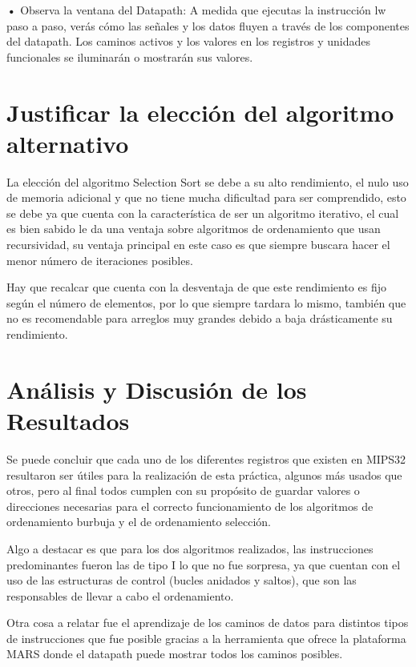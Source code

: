 \documentclass{article}
\begin{document}
\quad

\textbf{• } { Observa la ventana del Datapath: A medida que ejecutas la instrucción lw paso a paso, verás cómo las señales y los datos fluyen a través de los componentes del datapath. Los caminos activos y los valores en los registros y unidades funcionales se iluminarán o mostrarán sus valores.}


\quad
\newpage








\section{Justificar la elección del algoritmo alternativo}

\quad

{ La elección del algoritmo Selection Sort se debe a su alto rendimiento, el nulo uso de memoria adicional y que no tiene mucha dificultad para ser comprendido, esto se debe ya que cuenta con la característica de ser un algoritmo iterativo, el cual es bien sabido le da una ventaja sobre algoritmos de ordenamiento que usan recursividad, su ventaja principal en este caso es que siempre buscara hacer el menor número de iteraciones posibles.}

\quad

{ Hay que recalcar que cuenta con la desventaja de que este rendimiento es fijo según el número de elementos, por lo que siempre tardara lo mismo, también que no es recomendable para arreglos muy grandes debido a baja drásticamente su rendimiento.}

\quad
\newpage









\section{Análisis y Discusión de los Resultados}

\quad

{ Se puede concluir que cada uno de los diferentes registros que existen en MIPS32 resultaron ser útiles para la realización de esta práctica, algunos más usados que otros, pero al final todos cumplen con su propósito de guardar valores o direcciones necesarias para el correcto funcionamiento de los algoritmos de ordenamiento burbuja y el de ordenamiento selección.}

\quad

{ Algo a destacar es que para los dos algoritmos realizados, las instrucciones predominantes fueron las de tipo I lo que no fue sorpresa, ya que cuentan con el uso de las estructuras de control (bucles anidados y saltos), que son las responsables de llevar a cabo el ordenamiento.}

\quad

{Otra cosa a relatar fue el aprendizaje de los caminos de datos para distintos tipos de instrucciones que fue posible gracias a la herramienta que ofrece la plataforma MARS donde el datapath puede mostrar todos los caminos posibles.}

\quad
\newpage
\end{document}

